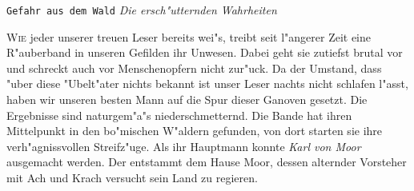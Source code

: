 \texttt{\Huge Gefahr aus dem Wald}
	\newline
\textit{\Large Die ersch"utternden Wahrheiten}
\normalsize

\begin{adjmulticols*}{3}{0pt}{0in}
 	\lettrine{W}{ie} jeder unserer treuen Leser bereits wei"s, treibt seit l"angerer Zeit eine R"auberband in unseren Gefilden ihr Unwesen. Dabei geht sie zutiefst brutal vor und schreckt auch vor Menschenopfern nicht zur"uck.
 	Da der Umstand, dass "uber diese "Ubelt"ater nichts bekannt ist unser Leser nachts nicht schlafen l"asst, haben wir unseren besten Mann auf die Spur dieser Ganoven gesetzt. Die Ergebnisse sind naturgem"a"s niederschmetternd.
 	Die Bande hat ihren Mittelpunkt in den bo"mischen W"aldern gefunden, von dort starten sie ihre verh"agnissvollen Streifz"uge. Als ihr Hauptmann konnte \textit{Karl von Moor} ausgemacht werden. Der entstammt dem Hause Moor, dessen alternder Vorsteher mit Ach und Krach versucht sein Land zu regieren.
\end{adjmulticols*}
